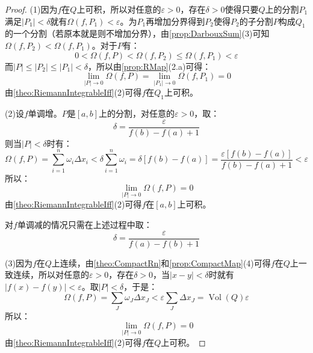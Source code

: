 \begin{proof}
	(1)因为$f$在$Q$上可积，所以对任意的$\varepsilon>0$，存在$\delta>0$使得只要$Q$上的分割$P_1$满足$|P_1|<\delta$就有$\Omega(f,P_1)<\varepsilon$。为$P_1$再增加分界得到$P_2$使得$P_2$的子分割$P$构成$Q_1$的一个分割（若原本就是则不增加分界），由\cref{prop:DarbouxSum}(3)可知$\Omega(f,P_2)<\Omega(f,P_1)$。对于$P$有：
	\begin{equation*}
		0<\Omega(f,P)<\Omega(f,P_2)\leqslant\Omega(f,P_1)<\varepsilon
	\end{equation*}
	而$|P|\leqslant|P_2|\leqslant|P_1|<\delta$，所以由\cref{prop:RMap}(2.a)可得：
	\begin{equation*}
		\lim_{|P|\to0}\Omega(f,P)=\lim_{|P_1|\to0}\Omega(f,P_1)=0
	\end{equation*}
	由\cref{theo:RiemannIntegrableIff}(2)可得$f$在$Q_1$上可积。\par
	(2)设$f$单调增。$P$是$[a,b]$上的分割，对任意的$\varepsilon>0$，取：
	\begin{equation*}
		\delta=\frac{\varepsilon}{f(b)-f(a)+1}
	\end{equation*}
	则当$|P|<\delta$时有：
	\begin{equation*}
		\Omega(f,P)=\sum_{i=1}^{n}\omega_i\Delta x_i<\delta\sum_{i=1}^{n}\omega_i=\delta[f(b)-f(a)]=\frac{\varepsilon[f(b)-f(a)]}{f(b)-f(a)+1}<\varepsilon
	\end{equation*}
	所以：
	\begin{equation*}
		\lim_{|P|\to0}\Omega(f,P)=0
	\end{equation*}
	由\cref{theo:RiemannIntegrableIff}(2)可得$f$在$[a,b]$上可积。\par
	对$f$单调减的情况只需在上述过程中取：
	\begin{equation*}
		\delta=\frac{\varepsilon}{f(a)-f(b)+1}
	\end{equation*}\par
	(3)因为$f$在$Q$上连续，由\cref{theo:CompactRn}和\cref{prop:CompactMap}(4)可得$f$在$Q$上一致连续，所以对任意的$\varepsilon>0$，存在$\delta>0$，当$|x-y|<\delta$时就有$|f(x)-f(y)|<\varepsilon$。取$|P|<\delta$，于是：
	\begin{equation*}
		\Omega(f,P)=\sum_{J}\omega_J\Delta x_J<\varepsilon\sum_{J}\Delta x_J=\operatorname{Vol}(Q)\varepsilon
	\end{equation*}
	所以：
	\begin{equation*}
		\lim_{|P|\to0}\Omega(f,P)=0
	\end{equation*}
	由\cref{theo:RiemannIntegrableIff}(2)可得$f$在$Q$上可积。\par

\end{proof}
